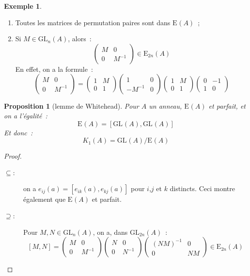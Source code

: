 \documentclass{amsart}
\theoremstyle{plain}
\newtheorem{prop}[theo]{Proposition}
\theoremstyle{definition}
\newtheorem{ex}[theo]{Exemple}
\theoremstyle{remark}
\newcommand{\GL}[2]{\mathrm{GL}_{#1}(#2)}
\newcommand{\EGL}[2]{\mathrm{E}_{#1}(#2)}
\begin{document}
\begin{ex}
  \begin{enumerate}
    \item Toutes les matrices de permutation paires sont dans $\EGL{}{A}$~;
    \item Si $M\in \GL{n}{A}$, alors~:
         $$\begin{pmatrix} M & 0 \\ 0 & M^{-1} \end{pmatrix}\in \EGL{2n}{A}$$
         En effet, on a la formule~:
         $$\begin{pmatrix} M & 0  \\ 0       & M^{-1} \end{pmatrix}=%
           \begin{pmatrix} 1 & M  \\ 0       & 1      \end{pmatrix}%
           \begin{pmatrix} 1 & 0  \\ -M^{-1} & 0      \end{pmatrix}%
           \begin{pmatrix} 1 & M  \\ 0       & 1      \end{pmatrix}%
           \begin{pmatrix} 0 & -1 \\ 1       & 0      \end{pmatrix}$$
  \end{enumerate}
\end{ex}

\begin{prop}[lemme de Whitehead]
  Pour $A$ un anneau, $\EGL{}{A}$ et parfait, et on a l'égalité~:
  $$\EGL{}{A}=[\GL{}{A},\GL{}{A}]$$
  Et donc~:
  $$K_1(A)=\GL{}{A}/\EGL{}{A}$$
\end{prop}

\begin{proof}
  \begin{description}
    \item[$\subseteq$:] on a $e_{ij}(a)=[e_{ik}(a),e_{kj}(a)]$ pour $i$,$j$ et $k$ distincts. Ceci montre également que $\EGL{}{A}$ et parfait.
    \item[$\supseteq$:] Pour $M,N\in \GL{n}{A}$, on a, dans $\GL{2n}{A}$~:
                      $$[M,N]=\begin{pmatrix} M         & 0  \\ 0 & M^{-1} \end{pmatrix}%
                              \begin{pmatrix} N         & 0  \\ 0 & N^{-1} \end{pmatrix}%
                              \begin{pmatrix} (NM)^{-1} & 0  \\ 0 & NM     \end{pmatrix}\in\EGL{2n}{A}$$ 
  \end{description}
\end{proof}
\end{document}
